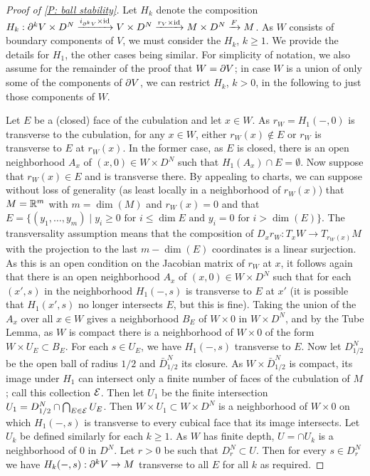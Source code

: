 \begin{proof}[Proof of \cref{P: ball stability}]
Let $H_k$ denote the composition $H_k:\partial^kV\times D^N\xrightarrow{i_{\partial^kV}\times \mathrm{id}}V\times D^N\xrightarrow{r_V\times \mathrm{id}} M\times D^N\xrightarrow{F} M$.
 As $W$ consists of boundary components of $V$, we must  consider the $H_k$, $k\geq 1$. We provide the details for $H_1$, the other cases being similar.
 For simplicity of notation, we also assume for the remainder of the proof that $W=\partial V$; in case $W$ is a union of only some of the components of $\partial V$, we can restrict $H_k$, $k>0$, in the following to just those components of $W$.

 Let $E$ be a (closed) face of the cubulation and let $x\in W$.  As $r_W=H_1(-,0)$ is transverse to the cubulation, for any $x\in W$, either $r_W(x)\notin E$ or $r_W$ is transverse to $E$ at $r_W(x)$. In the former case, as $E$ is closed, there is an open neighborhood $A_x$ of $(x,0)\in W\times D^N$ such that $H_1(A_x)\cap E=\emptyset$. Now suppose that $r_W(x)\in E$ and is transverse there. By appealing to charts, we can suppose without loss of generality  (as least locally in a neighborhood of $r_W(x)$) that $M=\mathbb{R}^m$ with $m=\dim(M)$ and $r_W(x)=0$ and that $E=\{(y_1,\ldots,y_m)\mid y_i\geq 0\text{ for } i\leq \dim E\text{ and } y_i=0 \text{ for } i>\dim(E)\}$. The transversality assumption means that the composition of $D_xr_W :T_xW\to T_{r_W(x)}M$ with the projection to the last $m-\dim(E)$ coordinates is a linear surjection. As this is an open condition on the Jacobian matrix of $r_W$ at $x$, it follows again that there is an open neighborhood $A_x$ of $(x,0)\in W\times D^N$ such that for each $(x',s)$ in the neighborhood $H_1(-,s)$ is transverse to $E$ at $x'$ (it is possible that $H_1(x',s)$ no longer intersects $E$, but this is fine). Taking the union of the $A_x$ over all $x\in W$ gives a neighborhood $B_E$ of $W\times 0$ in $W\times D^N$, and by the Tube Lemma, as $W$ is compact there is a neighborhood of $W\times 0$ of the form $W\times U_E\subset B_E$. For each $s\in U_E$, we have $H_1(-,s)$ transverse to $E$.
Now let $D^N_{1/2}$ be the open ball of radius $1/2$ and $\bar D^N_{1/2}$ its closure.
As $W\times \bar D^N_{1/2}$ is compact, its image under $H_1$ can intersect only a finite number of faces of the cubulation of $M$; call this collection $\mathcal{E}$. Then let $U_1$ be the finite intersection $U_1=D^N_{1/2}\cap \bigcap_{E\in\mathcal{E}} U_E$. Then $W\times U_1\subset W\times D^N$ is a neighborhood of $W\times 0$ on which $H_1(-,s)$ is transverse to every cubical face that its image intersects. Let $U_k$ be defined similarly for each $k\geq 1$. As $W$ has finite depth, $U=\cap U_k$ is a neighborhood of $0$ in $D^N$. Let $r>0$ be such that $D^N_r\subset U$. Then for every $s\in D^N_r$ we have $H_k(-,s):\partial^kV\to M$ transverse to all $E$ for all $k$ as required.


\end{proof}
